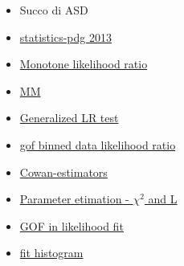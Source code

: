\documentclass[main.tex]{subfiles}
\begin{document}
\begin{itemize}
\item Succo di ASD
\item \href{http://pdg.lbl.gov/2013/reviews/rpp2013-rev-statistics.pdf}{statistics-pdg 2013}
\item \href{https://en.m.wikipedia.org/wiki/Monotone_likelihood_ratio}{Monotone likelihood ratio}
\item \href{https://pdfs.semanticscholar.org/b030/c65f8bd32e141ef1a28f7e289921786fadcf.pdf}{MM}
\item \href{https://web.stanford.edu/class/archive/stats/stats200/stats200.1172/Lecture22.pdf}{Generalized LR test}
\item \href{https://www.google.com/search?q=gof%20binned%20data%20likelihood%20ratio&ie=utf-8&oe=utf-8&client=firefox-b-m#sbfbu=1&pi=gof%20binned%20data%20likelihood%20ratio}{gof binned data likelihood ratio}
\item \href{https://agenda.infn.it/event/16360/contributions/33703/attachments/63753/76855/cowan_paestum_2019.pdf}{Cowan-estimators}
\item \href{https://www.physik.hu-berlin.de/de/gk1504/block-courses/autumn-2010/program_and_talks/Verkerke_part3}{Parameter etimation - $\chi^2$ and L}
\item \href{https://arxiv.org/pdf/physics/0509008.pdf}{GOF in likelihood fit}
\item \href{https://physique.cuso.ch/fileadmin/physique/document/jameschap7.pdf}{fit histogram}
\end{itemize}
\end{document}
